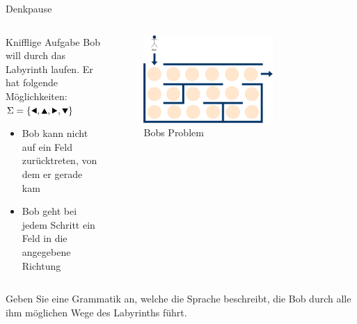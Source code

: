 {
\begin{frame}{Denkpause}
    \begin{columns}
        \begin{alertblock}{Knifflige Aufgabe}
            Bob will durch das Labyrinth laufen. Er hat folgende Möglichkeiten:\\
            $\Sigma = \{\text{\Rewind}, \text{\MoveUp}, \text{\Forward}, \text{\MoveDown}\}$
            \begin{itemize}
                \item Bob kann nicht auf ein Feld zurücktreten, von dem er gerade kam
                \item Bob geht bei jedem Schritt ein Feld in die angegebene Richtung
            \end{itemize}
        \end{alertblock}
        \begin{figure}
            \centering
            \includegraphics[width=0.7\textwidth]{../figures/GBeispiel.png}
            \caption{Bobs Problem}

        \end{figure}
    \end{columns}
    \alert{Geben Sie eine Grammatik an, welche die Sprache beschreibt, die Bob durch alle ihm möglichen Wege des Labyrinths führt.}
\end{frame}
}

